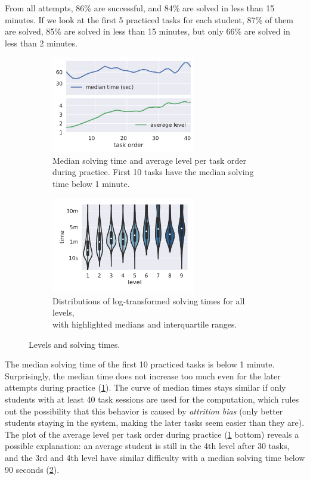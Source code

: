 From all attempts, 86\% are successful, and 84\% are solved in less than 15 minutes.
If we look at the first 5 practiced tasks for each student, 87\% of them are solved,
85\% are solved in less than 15 minutes, but only 66\% are solved in less than 2 minutes.


\begin{figure}[htb]
\centering
\begin{subfigure}{.48\textwidth}
\centering
\includegraphics[height=42mm]{img/median-time-order}
\caption{Median solving time and average level per task order during practice.
  First 10 tasks have the median solving time below 1 minute.}
\label{fig:solving-times-per-order}
\end{subfigure}
\begin{subfigure}{.51\textwidth}
\centering
\includegraphics[height=42mm]{img/levels-time}
\caption{Distributions of log-transformed solving times for all levels,\\
         with highlighted medians and interquartile ranges.}
\label{fig:levels-time}
\end{subfigure}
\caption{Levels and solving times.}
\label{fig:solving-times}
\end{figure}



The median solving time of the first 10 practiced tasks is below 1 minute.
Surprisingly, the median time does not increase too much even for the later
attempts during practice (\cref{fig:solving-times-per-order}).
The curve of median times stays similar
if only students with at least 40 task sessions are used for the computation,
which rules out the possibility that this behavior is caused by \emph{attrition bias}
(only better students staying in the system, making the later tasks seem easier than they are).
The plot of the average level per task order during practice
(\cref{fig:solving-times-per-order} bottom) reveals a possible explanation:
an average student is still in the 4th level after 30 tasks,
and the 3rd and 4th level have similar difficulty with a median solving time below 90 seconds
(\cref{fig:levels-time}).



